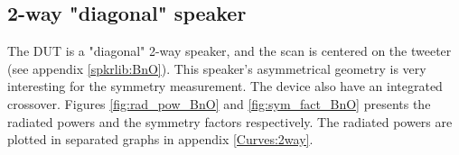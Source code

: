 \documentclass{report}
\begin{document}

\subsection{2-way "diagonal" speaker}

The DUT is a "diagonal" 2-way speaker, and the scan is centered on the tweeter (see appendix \ref{spkrlib:BnO}). This speaker's asymmetrical geometry is very interesting for the symmetry measurement. The device also have an integrated crossover. Figures \ref{fig:rad_pow_BnO} and \ref{fig:sym_fact_BnO} presents the radiated powers and the symmetry factors respectively. The radiated powers are plotted in separated graphs in appendix \ref{Curves:2way}. \\
\end{document}
